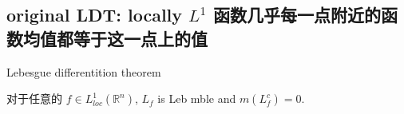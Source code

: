 \documentclass{qlnotes-export}
\begin{document}
\subsection{\texorpdfstring{original LDT: locally \(L^{1}\) 函数几乎每一点附近的函数均值都等于这一点上的值}{original LDT: locally L\^{}\{1\} 函数几乎每一点附近的函数均值都等于这一点上的值}}\label{original-ldt-locally-l1-ux51fdux6570ux51e0ux4e4eux6bcfux4e00ux70b9ux9644ux8fd1ux7684ux51fdux6570ux5747ux503cux90fdux7b49ux4e8eux8fd9ux4e00ux70b9ux4e0aux7684ux503c}

\begin{theorem}{Lebesgue differentition theorem}\label{thm-08-hardy-littlewood-ldt-lebesgue-differentition-theorem}

对于任意的 \(f \in L_{loc}^{1}({\mathbb{R}}^{n})\), \(L_{f}\) is Leb mble and \(m(L_{f}^{c}) = 0\).

\end{theorem}
\end{document}
